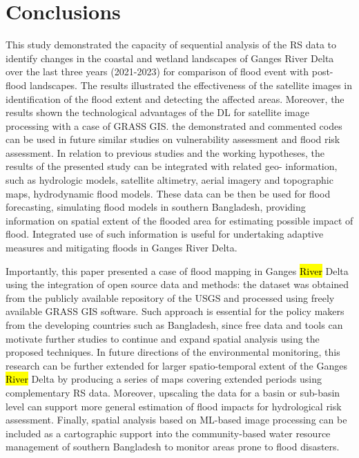 \documentclass[water,article,submit,pdftex,moreauthors]{Definitions/mdpi}
\begin{document}
\section{Conclusions}
This study demonstrated the capacity of sequential analysis of the RS data to identify changes in the coastal and wetland landscapes of Ganges River Delta over the last three years (2021-2023) for comparison of flood event with post-flood landscapes. The results illustrated the effectiveness of the satellite images in identification of the flood extent and detecting the affected areas. Moreover, the results shown the technological advantages of the DL for satellite image processing with a case of GRASS GIS. the demonstrated and commented codes can be used in future similar studies on vulnerability assessment and flood risk assessment. In relation to previous studies and the working hypotheses, the results of the presented study can be integrated with related geo- information, such as hydrologic models, satellite altimetry, aerial imagery and topographic maps, hydrodynamic flood models. These data can be then be used for flood forecasting, simulating flood models in southern Bangladesh, providing information on spatial extent of the flooded area for estimating possible impact of flood. Integrated use of such information is useful  for undertaking adaptive measures and mitigating floods in Ganges River Delta.

Importantly, this paper presented a case of flood mapping in Ganges \hl{River} Delta using the integration of open source data and methods: the dataset was obtained from the publicly available repository of the USGS and processed using freely available GRASS GIS software. Such approach is essential for the policy makers from the developing countries such as Bangladesh, since free data and tools can motivate further studies to continue and expand spatial analysis using the proposed techniques. In future directions of the environmental monitoring, this research can be further extended for larger spatio-temporal extent of the Ganges \hl{River} Delta by producing a series of maps covering extended periods using complementary RS data. Moreover, upscaling the data for a basin or sub-basin level can support more general estimation of flood impacts for hydrological risk assessment. Finally, spatial analysis based on ML-based image processing can be included as a cartographic support into the community-based water resource management of southern Bangladesh to monitor areas prone to flood disasters.
\end{document}
